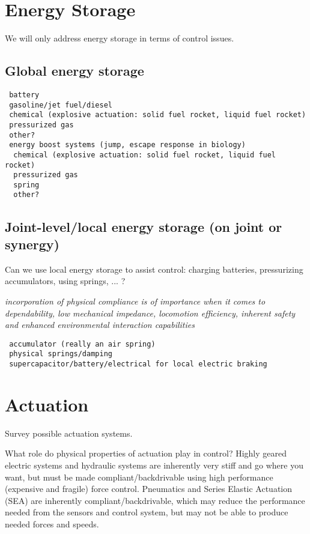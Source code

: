 \documentclass[letterpaper,12pt,fullpage]{article}
\begin{document}
\section{Energy Storage}

We will only address energy storage
in terms of control issues.

\subsection{Global energy storage}

\begin{verbatim}
 battery
 gasoline/jet fuel/diesel
 chemical (explosive actuation: solid fuel rocket, liquid fuel rocket)
 pressurized gas
 other?
 energy boost systems (jump, escape response in biology)
  chemical (explosive actuation: solid fuel rocket, liquid fuel rocket)
  pressurized gas
  spring
  other?
\end{verbatim}

\subsection{Joint-level/local energy storage (on joint or synergy)}

Can we use local energy storage to assist control: charging batteries,
pressurizing accumulators, using springs, ... ?

{\it incorporation of physical
compliance is of importance when it comes to dependability,
low mechanical impedance, locomotion efficiency, inherent
safety and enhanced environmental interaction capabilities}~\cite{IEEE07139975}

\begin{verbatim}
 accumulator (really an air spring)
 physical springs/damping
 supercapacitor/battery/electrical for local electric braking
\end{verbatim}

\section{Actuation}

Survey possible actuation systems.

What role do physical properties of actuation play in control? Highly
geared electric systems and hydraulic systems are inherently very
stiff and go where you want, but must be made compliant/backdrivable
using high performance (expensive and fragile) force control.
Pneumatics and Series Elastic Actuation (SEA) are inherently
compliant/backdrivable, which may reduce the performance
needed from the sensors and control system, but may not be able to
produce needed forces and speeds.
\end{document}

